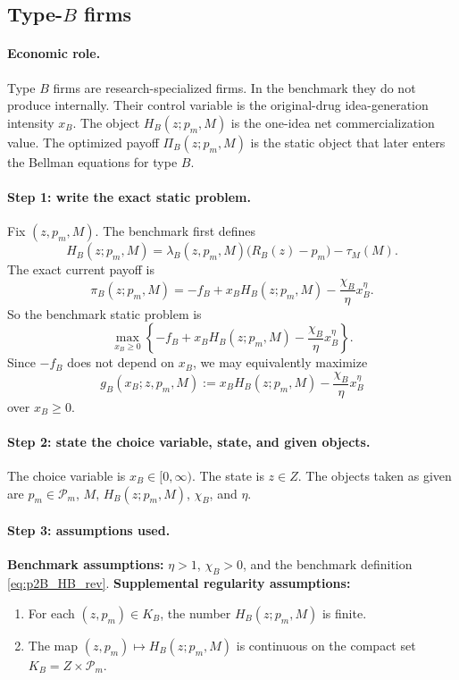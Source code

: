 \subsection{Type-$B$ firms}

\paragraph{Economic role.}
Type $B$ firms are research-specialized firms. In the benchmark they do not produce internally. Their control variable is the original-drug idea-generation intensity $x_B$. The object $H_B(z;p_m,M)$ is the one-idea net commercialization value. The optimized payoff $\Pi_B(z;p_m,M)$ is the static object that later enters the Bellman equations for type $B$.

\paragraph{Step 1: write the exact static problem.}
Fix $(z,p_m,M)$. The benchmark first defines
\begin{equation}
H_B(z;p_m,M)=\lambda_B(z,p_m,M)\bigl(R_B(z)-p_m\bigr)-\tau_M(M).
\label{eq:p2B_HB_rev}
\end{equation}
The exact current payoff is
\begin{equation}
\pi_B(z;p_m,M)
=
-f_B+x_BH_B(z;p_m,M)-\frac{\chi_B}{\eta}x_B^\eta.
\label{eq:p2B_payoff_primitive_rev}
\end{equation}
So the benchmark static problem is
\begin{equation}
\max_{x_B\ge 0}
\left\{
-f_B+x_BH_B(z;p_m,M)-\frac{\chi_B}{\eta}x_B^\eta
\right\}.
\label{eq:p2B_problem_rev}
\end{equation}
Since $-f_B$ does not depend on $x_B$, we may equivalently maximize
\[
g_B(x_B;z,p_m,M):=x_BH_B(z;p_m,M)-\frac{\chi_B}{\eta}x_B^\eta
\]
over $x_B\ge 0$.

\paragraph{Step 2: state the choice variable, state, and given objects.}
The choice variable is $x_B\in[0,\infty)$. The state is $z\in Z$. The objects taken as given are $p_m\in\mathcal P_m$, $M$, $H_B(z;p_m,M)$, $\chi_B$, and $\eta$.

\paragraph{Step 3: assumptions used.}
\textbf{Benchmark assumptions:} $\eta>1$, $\chi_B>0$, and the benchmark definition \eqref{eq:p2B_HB_rev}.  
\textbf{Supplemental regularity assumptions:}
\begin{enumerate}
    \item[(B1)] For each $(z,p_m)\in K_B$, the number $H_B(z;p_m,M)$ is finite.
    \item[(B2)] The map $(z,p_m)\mapsto H_B(z;p_m,M)$ is continuous on the compact set $K_B=Z\times\mathcal P_m$.
\end{enumerate}

